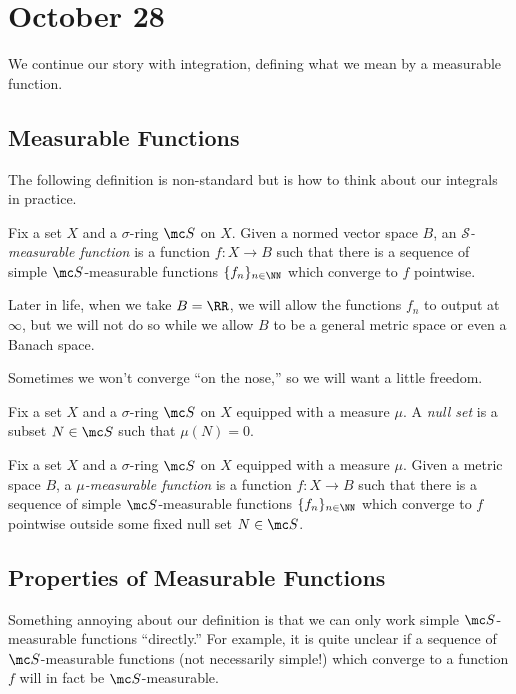 \documentclass[../notes.tex]{subfiles}
\begin{document}
\section{October 28}

We continue our story with integration, defining what we mean by a measurable function.

\subsection{Measurable Functions}
The following definition is non-standard but is how to think about our integrals in practice.
\begin{definition}
	Fix a set $X$ and a $\sigma$-ring $\mc S$ on $X$. Given a normed vector space $B$, an \textit{$\mathcal S$-measurable function} is a function $f\colon X\to B$ such that there is a sequence of simple $\mc S$-measurable functions $\{f_n\}_{n\in\NN}$ which converge to $f$ pointwise.
\end{definition}
\begin{remark}
	Later in life, when we take $B=\RR$, we will allow the functions $f_n$ to output at $\infty$, but we will not do so while we allow $B$ to be a general metric space or even a Banach space.
\end{remark}
Sometimes we won't converge ``on the nose,'' so we will want a little freedom.
\begin{definition}
	Fix a set $X$ and a $\sigma$-ring $\mc S$ on $X$ equipped with a measure $\mu$. A \textit{null set} is a subset $N\in\mc S$ such that $\mu(N)=0$.
\end{definition}
\begin{definition}
	Fix a set $X$ and a $\sigma$-ring $\mc S$ on $X$ equipped with a measure $\mu$. Given a metric space $B$, a \textit{$\mu$-measurable function} is a function $f\colon X\to B$ such that there is a sequence of simple $\mc S$-measurable functions $\{f_n\}_{n\in\NN}$ which converge to $f$ pointwise outside some fixed null set $N\in\mc S$.
\end{definition}

\subsection{Properties of Measurable Functions}
Something annoying about our definition is that we can only work simple $\mc S$-measurable functions ``directly.'' For example, it is quite unclear if a sequence of $\mc S$-measurable functions (not necessarily simple!) which converge to a function $f$ will in fact be $\mc S$-measurable.
\end{document}
